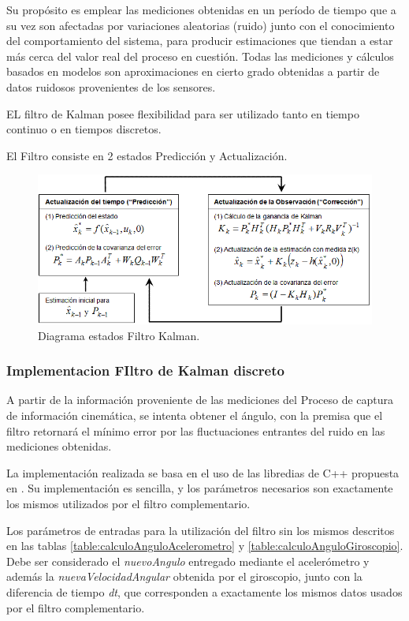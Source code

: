 \documentclass[12pt,a4paper]{article}
\begin{document}
Su propósito es emplear las mediciones obtenidas en un período de tiempo que a su vez son afectadas por variaciones  aleatorias (ruido) junto con el conocimiento del comportamiento del sistema, para producir estimaciones que tiendan a estar más cerca del valor real del proceso en cuestión. Todas las mediciones y cálculos basados en modelos son aproximaciones en cierto grado obtenidas a partir de datos ruidosos provenientes de los sensores.

EL filtro de Kalman posee flexibilidad para ser utilizado tanto en tiempo continuo o en tiempos discretos.

El Filtro consiste en 2 estados Predicción y Actualización.

\begin{figure}[H]
	\centering
	\includegraphics[scale=0.65]{images/kalman-filter.png} 
	\caption{Diagrama estados Filtro Kalman.}
	\label{fig:diagramakalman}
\end{figure}

\subsubsection{Implementacion FIltro de Kalman discreto}
A partir de la información proveniente de las mediciones del Proceso de captura de información cinemática, se intenta obtener el ángulo, con la premisa que el filtro retornará el mínimo error por las fluctuaciones entrantes del ruido en las mediciones obtenidas.

La implementación realizada se basa en el uso de las libredias de C++ propuesta en \cite{kalmanTKJ}. Su implementación es sencilla, y los parámetros necesarios son exactamente los mismos utilizados por el filtro complementario.

Los parámetros de entradas para la utilización del filtro sin los mismos descritos en las tablas \ref{table:calculoAnguloAcelerometro} y \ref{table:calculoAnguloGiroscopio}.
Debe ser considerado el \textit{nuevoAngulo} entregado mediante el acelerómetro y además la \textit{nuevaVelocidadAngular} obtenida por el giroscopio, junto con la diferencia de tiempo \textit{dt}, que corresponden a exactamente los mismos datos usados por el filtro complementario.
\end{document}
